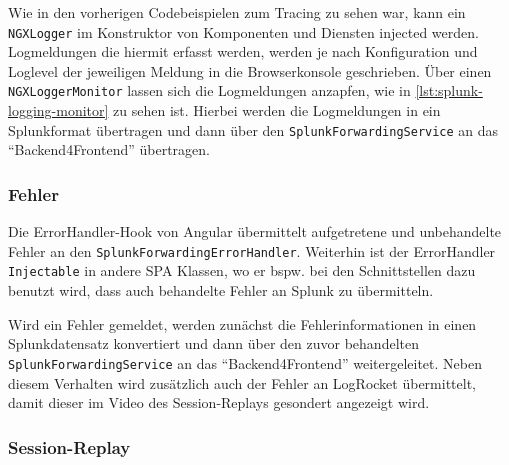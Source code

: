 Wie in den vorherigen Codebeispielen zum Tracing zu sehen war, kann ein \texttt{NGXLogger} im Konstruktor von Komponenten und Diensten injected werden. Logmeldungen die hiermit erfasst werden, werden je nach Konfiguration und Loglevel der jeweiligen Meldung in die Browserkonsole geschrieben. Über einen \texttt{NGXLoggerMonitor} lassen sich die Logmeldungen anzapfen, wie in \autoref{lst:splunk-logging-monitor} zu sehen ist. Hierbei werden die Logmeldungen in ein Splunkformat übertragen und dann über den \texttt{SplunkForwardingService} an das \enquote{Backend4Frontend} übertragen.



\subsubsection{Fehler}

Die ErrorHandler-Hook von Angular übermittelt aufgetretene und unbehandelte Fehler an den \texttt{SplunkForwardingErrorHandler}. Weiterhin ist der ErrorHandler \texttt{Injectable} in andere SPA Klassen, wo er bspw. bei den Schnittstellen dazu benutzt wird, dass auch behandelte Fehler an Splunk zu übermitteln.

Wird ein Fehler gemeldet, werden zunächst die Fehlerinformationen in einen Splunkdatensatz konvertiert und dann über den zuvor behandelten \texttt{SplunkForwardingService} an das \enquote{Backend4Frontend} weitergeleitet. Neben diesem Verhalten wird zusätzlich auch der Fehler an LogRocket übermittelt, damit dieser im Video des Session-Replays gesondert angezeigt wird.



\subsubsection{Session-Replay}

